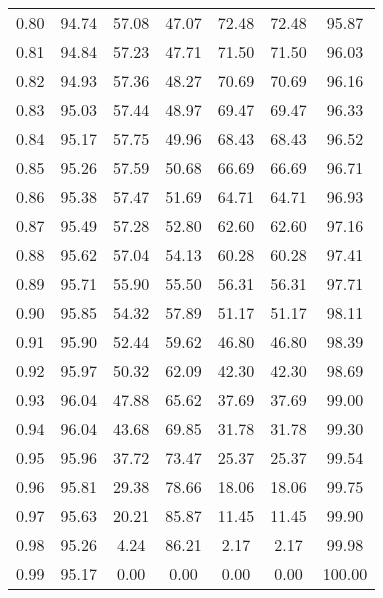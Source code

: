 \begin{tabular}{|c|c|c|c|c|c|c|}
      0.80 &     94.74 &     57.08 &      47.07 &   72.48 &      72.48 &         95.87 \\
      0.81 &     94.84 &     57.23 &      47.71 &   71.50 &      71.50 &         96.03 \\
      0.82 &     94.93 &     57.36 &      48.27 &   70.69 &      70.69 &         96.16 \\
      0.83 &     95.03 &     57.44 &      48.97 &   69.47 &      69.47 &         96.33 \\
      0.84 &     95.17 &     57.75 &      49.96 &   68.43 &      68.43 &         96.52 \\
      0.85 &     95.26 &     57.59 &      50.68 &   66.69 &      66.69 &         96.71 \\
      0.86 &     95.38 &     57.47 &      51.69 &   64.71 &      64.71 &         96.93 \\
      0.87 &     95.49 &     57.28 &      52.80 &   62.60 &      62.60 &         97.16 \\
      0.88 &     95.62 &     57.04 &      54.13 &   60.28 &      60.28 &         97.41 \\
      0.89 &     95.71 &     55.90 &      55.50 &   56.31 &      56.31 &         97.71 \\
      0.90 &     95.85 &     54.32 &      57.89 &   51.17 &      51.17 &         98.11 \\
      0.91 &     95.90 &     52.44 &      59.62 &   46.80 &      46.80 &         98.39 \\
      0.92 &     95.97 &     50.32 &      62.09 &   42.30 &      42.30 &         98.69 \\
      0.93 &     96.04 &     47.88 &      65.62 &   37.69 &      37.69 &         99.00 \\
      0.94 &     96.04 &     43.68 &      69.85 &   31.78 &      31.78 &         99.30 \\
      0.95 &     95.96 &     37.72 &      73.47 &   25.37 &      25.37 &         99.54 \\
      0.96 &     95.81 &     29.38 &      78.66 &   18.06 &      18.06 &         99.75 \\
      0.97 &     95.63 &     20.21 &      85.87 &   11.45 &      11.45 &         99.90 \\
      0.98 &     95.26 &      4.24 &      86.21 &    2.17 &       2.17 &         99.98 \\
      0.99 &     95.17 &      0.00 &       0.00 &    0.00 &       0.00 &        100.00 \\
\bottomrule
\end{tabular}
